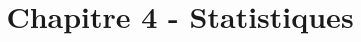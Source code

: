 \documentclass[paper=a4, fontsize=9pt]{scrartcl} %
\title{
  \vspace{-10ex}
  \horrule{0.5pt} \\[0.4cm] %
  \huge Chapitre 4 - Statistiques\\ %
  \horrule{2pt} \\[0.5cm] %
}
\author{}
\date{\vspace{-10ex}} %
\begin{document}

\newtheorem{Definition}{Définition}
\newtheorem{Theorem}{Théorème}
\newtheorem{Proposition}{Propriété}

\renewcommand{\labelitemi}{$\bullet$}
\renewcommand{\labelitemii}{$\circ$}

\maketitle %
\setlength{\columnseprule}{1pt}

\end{document}
